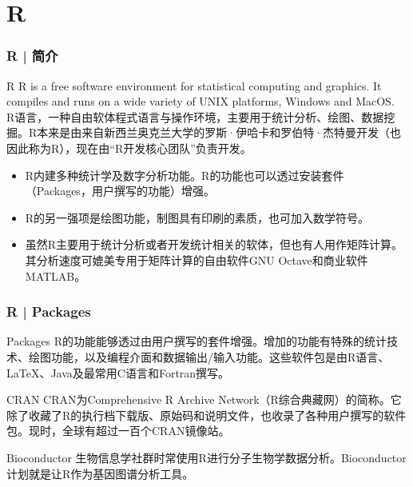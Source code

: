 \section{R}
\begin{frame}
  \frametitle{R | 简介}
  \begin{block}{R}
 R is a free software environment for statistical computing and graphics. It compiles and runs on a wide variety of UNIX platforms, Windows and MacOS.\\
\vspace{0.3em}
R语言，一种自由软体程式语言与操作环境，主要用于统计分析、绘图、数据挖掘。R本来是由来自新西兰奥克兰大学的罗斯·伊哈卡和罗伯特·杰特曼开发（也因此称为R），现在由“R开发核心团队”负责开发。\\
\begin{itemize}
  \item R内建多种统计学及数字分析功能。R的功能也可以透过安装套件（Packages，用户撰写的功能）增强。
  \item R的另一强项是绘图功能，制图具有印刷的素质，也可加入数学符号。
  \item 虽然R主要用于统计分析或者开发统计相关的软体，但也有人用作矩阵计算。其分析速度可媲美专用于矩阵计算的自由软件GNU Octave和商业软件MATLAB。
\end{itemize}
  \end{block}
\end{frame}

\begin{frame}
  \frametitle{R | Packages}
  \begin{block}{Packages}
R的功能能够透过由用户撰写的套件增强。增加的功能有特殊的统计技术、绘图功能，以及编程介面和数据输出/输入功能。这些软件包是由R语言、LaTeX、Java及最常用C语言和Fortran撰写。
  \end{block}
  \pause
  \begin{block}{CRAN}
    CRAN为Comprehensive R Archive Network（R综合典藏网）的简称。它除了收藏了R的执行档下载版、原始码和说明文件，也收录了各种用户撰写的软件包。现时，全球有超过一百个CRAN镜像站。
  \end{block}
  \pause
  \begin{block}{Bioconductor}
    生物信息学社群时常使用R进行分子生物学数据分析。Bioconductor计划就是让R作为基因图谱分析工具。
  \end{block}
\end{frame}

